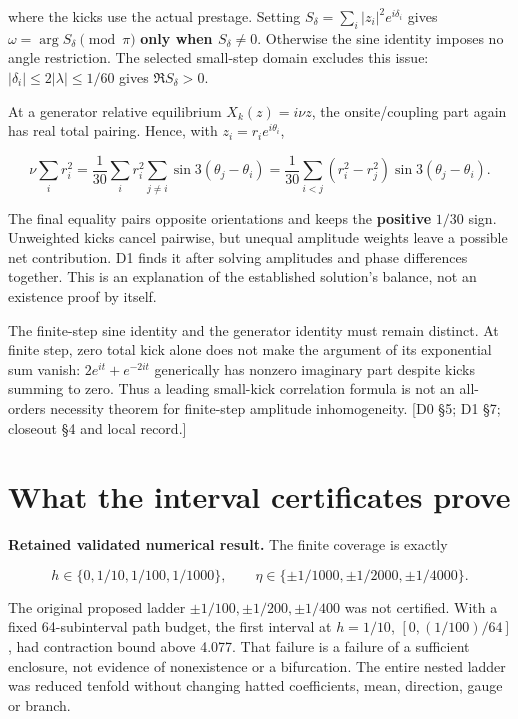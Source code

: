 \documentclass[11pt,a4paper]{article}
\begin{document}
where the kicks use the actual prestage. Setting \(S_\delta=\sum_i|z_i|^2e^{i\delta_i}\) gives \(\omega=\arg S_\delta\pmod\pi\) \textbf{only when \(S_\delta\ne0\)}. Otherwise the sine identity imposes no angle restriction. The selected small-step domain excludes this issue: \(|\delta_i|\le2|\lambda|\le1/60\) gives \(\Re S_\delta>0\).

At a generator relative equilibrium \(X_k(z)=i\nu z\), the onsite/\allowbreak{}coupling part again has real total pairing. Hence, with \(z_i=r_i e^{i\theta_i}\),

\[
\boxed{\nu\sum_i r_i^2=\frac1{30}\sum_i r_i^2
\sum_{j\ne i}\sin3(\theta_j-\theta_i)
=\frac1{30}\sum_{i<j}(r_i^2-r_j^2)\sin3(\theta_j-\theta_i).}
\tag{D40}\label{eq:D40}
\]

The final equality pairs opposite orientations and keeps the \textbf{positive} \(1/30\) sign. Unweighted kicks cancel pairwise, but unequal amplitude weights leave a possible net contribution. D1 finds it after solving amplitudes and phase differences together. This is an explanation of the established solution's balance, not an existence proof by itself.

The finite-step sine identity and the generator identity must remain distinct. At finite step, zero total kick alone does not make the argument of its exponential sum vanish: \(2e^{it}+e^{-2it}\) generically has nonzero imaginary part despite kicks summing to zero. Thus a leading small-kick correlation formula is not an all-orders necessity theorem for finite-step amplitude inhomogeneity. [D0 \S{}5; D1 \S{}7; closeout \S{}4 and local record.]

\section{What the interval certificates prove}

\textbf{Retained validated numerical result.} The finite coverage is exactly

\[
h\in\{0,1/10,1/100,1/1000\},\qquad
\eta\in\{\pm1/1000,\pm1/2000,\pm1/4000\}.
\tag{D41}\label{eq:D41}
\]

The original proposed ladder \(\pm1/100,\pm1/200,\pm1/400\) was not certified. With a fixed 64-subinterval path budget, the first interval at \(h=1/10\), \([0,(1/100)/64]\), had contraction bound above 4.077. That failure is a failure of a sufficient enclosure, not evidence of nonexistence or a bifurcation. The entire nested ladder was reduced tenfold without changing hatted coefficients, mean, direction, gauge or branch.
\end{document}
